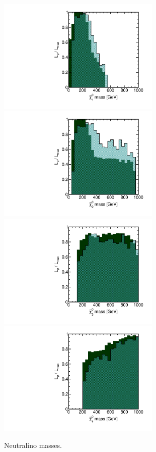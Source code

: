 \begin{figure}[htbp]
\begin{center}
\includegraphics[height=5.5cm]{figs/fig_chi_1_0.pdf} 
\includegraphics[height=5.5cm]{figs/fig_chi_2_0.pdf} \\
\includegraphics[height=5.5cm]{figs/fig_chi_3_0.pdf} 
\includegraphics[height=5.5cm]{figs/fig_chi_4_0.pdf} 
\caption{Neutralino masses.}
\label{default}
\end{center}
\end{figure}

